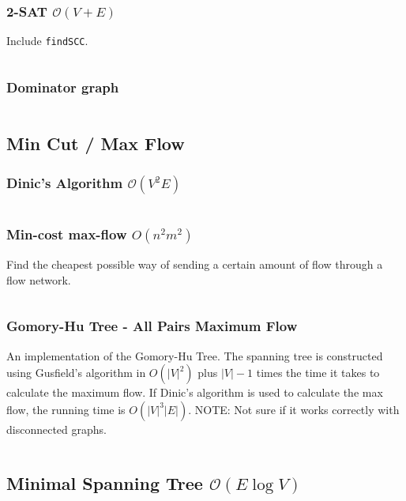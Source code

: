 \documentclass[8pt,a4paper,landscape,oneside]{amsart}
\newcommand{\mintedstyle}[2]{\inputminted[fontsize=\normalsize,baselinestretch=.9,breaklines,breakautoindent,tabsize=2]{#1}{code/#2}}
\newcommand{\code}[1]{\mintedstyle{cpp}{#1}}
\begin{document}
\begin{multicols*}{3}
\subsubsection{2-SAT $\mathcal{O}(V+E)$}
Include \texttt{findSCC}.
\code{satsolver.cpp}

\subsubsection{Dominator graph}
\code{graphs/dominator.cpp}

\subsection{Min Cut / Max Flow}
\subsubsection{Dinic's Algorithm $\mathcal{O}(V^{2} E)$}
\code{graphs/dinic.cpp}

\subsubsection{Min-cost max-flow $O(n^2 m^2)$}
Find the cheapest possible way of sending a certain amount of flow through a flow network.
\code{graphs/mincostmaxflow.cpp}

\subsubsection{Gomory-Hu Tree - All Pairs Maximum Flow}
An implementation of the Gomory-Hu Tree. The spanning tree is constructed using Gusfield's algorithm
in $O(|V| ^ 2)$ plus $|V|-1$ times the time it takes to calculate the maximum flow.
If Dinic's algorithm is used to calculate the max flow, the running time is $O(|V|^3|E|)$.
NOTE: Not sure if it works correctly with disconnected graphs.
\code{graphs/gomory_hu_tree.cpp}

\subsection{Minimal Spanning Tree $\mathcal{O}(E \log V)$}


\end{multicols*}
\end{document}
